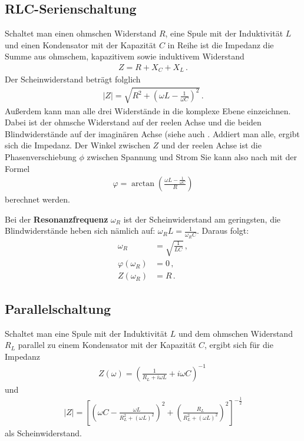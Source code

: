 \documentclass[12pt,a4paper,titlepage,headinclude,bibtotoc]{scrartcl}
\begin{document}
\subsection{RLC-Serienschaltung}
Schaltet man einen ohmschen Widerstand $R$, eine Spule mit der Induktivität $L$ und einen Kondensator mit der Kapazität $C$ in Reihe ist die Impedanz die Summe aus ohmschem, kapazitivem sowie induktivem Widerstand
\begin{align}
	Z=R+X_C+X_L \,.
\end{align}
Der Scheinwiderstand beträgt folglich
\begin{align}
	|Z|=\sqrt{R^2+\left(\omega L - \frac{1}{\omega C}\right)^2} \,.
	\label{eq:Scheinwiderstand_serie}
\end{align}
Außerdem kann man alle drei Widerstände in die komplexe Ebene einzeichnen.
Dabei ist der ohmsche Widerstand auf der reelen Achse und die beiden Blindwiderstände auf der imaginären Achse (siehe auch \cite[S. 418]{gerthsen}.
Addiert man alle, ergibt sich die Impedanz.
Der Winkel zwischen $Z$ und der reelen Achse ist die Phasenverschiebung $\phi$ zwischen Spannung und Strom 
Sie kann also nach \cite[S. 157]{demtroeder2} mit der Formel 
\begin{align}
	\varphi=\arctan\left(\frac{\omega L - \frac{1}{\omega C}}{R} \right)
	\label{eq:phase_serie}
\end{align}
berechnet werden.

Bei der \textbf{Resonanzfrequenz} $\omega_R$ ist der Scheinwiderstand am geringsten, die Blindwiderstände heben sich nämlich auf: $\omega_R L=\frac{1}{\omega_R C}$.
Daraus folgt:
\begin{align}
	\omega_R&=\sqrt{\frac{1}{LC}}
	\label{eq:omega_R}	
	\,,\\
	\varphi(\omega_R)&=0\,,\\
	Z(\omega_R)&=R\,.
\end{align}

\subsection{Parallelschaltung}
Schaltet man eine Spule mit der Induktivität $L$ und dem ohmschen Widerstand $R_L$ parallel zu einem Kondensator mit der Kapazität $C$, ergibt sich für die Impedanz
\begin{align}
	Z(\omega)=\left(\frac{1}{R_L+i\omega L}+i\omega C\right)^{-1}\
\end{align}
und
\begin{align}
	|Z|=\left[\left(\omega C - \frac{\omega L}{R_L^2+(\omega L)^2}\right)^2+	\left(\frac{R_L}{R_L^2+(\omega L)^2}\right)^2\right]^{-\frac{1}{2}}
	\label{eq:parallel}
\end{align}
als Scheinwiderstand.
                                                                                                                                                                      
\end{document}
